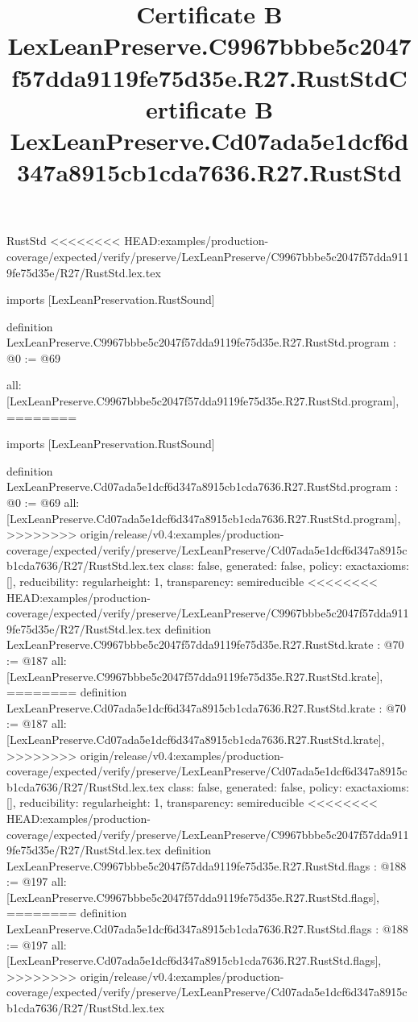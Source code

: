\begin{lexlean}{RustStd}
<<<<<<<< HEAD:examples/production-coverage/expected/verify/preserve/LexLeanPreserve/C9967bbbe5c2047f57dda9119fe75d35e/R27/RustStd.lex.tex
\title{Certificate B LexLeanPreserve.C9967bbbe5c2047f57dda9119fe75d35e.R27.RustStd}
\begin{coremodule}
imports [LexLeanPreservation.RustSound]

definition LexLeanPreserve.C9967bbbe5c2047f57dda9119fe75d35e.R27.RustStd.program : @0 := @69 {
  all: [LexLeanPreserve.C9967bbbe5c2047f57dda9119fe75d35e.R27.RustStd.program],
========
\title{Certificate B LexLeanPreserve.Cd07ada5e1dcf6d347a8915cb1cda7636.R27.RustStd}
\begin{coremodule}
imports [LexLeanPreservation.RustSound]

definition LexLeanPreserve.Cd07ada5e1dcf6d347a8915cb1cda7636.R27.RustStd.program : @0 := @69 {
  all: [LexLeanPreserve.Cd07ada5e1dcf6d347a8915cb1cda7636.R27.RustStd.program],
>>>>>>>> origin/release/v0.4:examples/production-coverage/expected/verify/preserve/LexLeanPreserve/Cd07ada5e1dcf6d347a8915cb1cda7636/R27/RustStd.lex.tex
  class: false,
  generated: false,
  policy: exact{axioms: []},
  reducibility: regular{height: 1},
  transparency: semireducible
}
<<<<<<<< HEAD:examples/production-coverage/expected/verify/preserve/LexLeanPreserve/C9967bbbe5c2047f57dda9119fe75d35e/R27/RustStd.lex.tex
definition LexLeanPreserve.C9967bbbe5c2047f57dda9119fe75d35e.R27.RustStd.krate : @70 := @187 {
  all: [LexLeanPreserve.C9967bbbe5c2047f57dda9119fe75d35e.R27.RustStd.krate],
========
definition LexLeanPreserve.Cd07ada5e1dcf6d347a8915cb1cda7636.R27.RustStd.krate : @70 := @187 {
  all: [LexLeanPreserve.Cd07ada5e1dcf6d347a8915cb1cda7636.R27.RustStd.krate],
>>>>>>>> origin/release/v0.4:examples/production-coverage/expected/verify/preserve/LexLeanPreserve/Cd07ada5e1dcf6d347a8915cb1cda7636/R27/RustStd.lex.tex
  class: false,
  generated: false,
  policy: exact{axioms: []},
  reducibility: regular{height: 1},
  transparency: semireducible
}
<<<<<<<< HEAD:examples/production-coverage/expected/verify/preserve/LexLeanPreserve/C9967bbbe5c2047f57dda9119fe75d35e/R27/RustStd.lex.tex
definition LexLeanPreserve.C9967bbbe5c2047f57dda9119fe75d35e.R27.RustStd.flags : @188 := @197 {
  all: [LexLeanPreserve.C9967bbbe5c2047f57dda9119fe75d35e.R27.RustStd.flags],
========
definition LexLeanPreserve.Cd07ada5e1dcf6d347a8915cb1cda7636.R27.RustStd.flags : @188 := @197 {
  all: [LexLeanPreserve.Cd07ada5e1dcf6d347a8915cb1cda7636.R27.RustStd.flags],
>>>>>>>> origin/release/v0.4:examples/production-coverage/expected/verify/preserve/LexLeanPreserve/Cd07ada5e1dcf6d347a8915cb1cda7636/R27/RustStd.lex.tex
}}}
\end{coremodule}}
\end{coremodule}
\end{lexlean}
